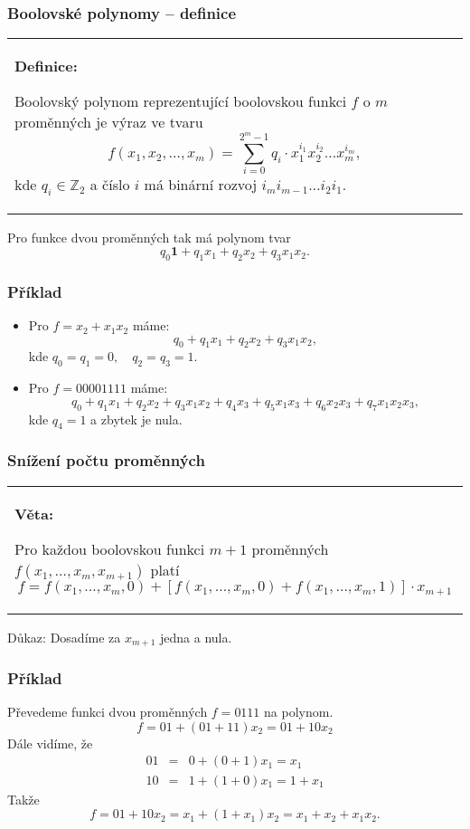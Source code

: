 \documentclass{beamer}
\newenvironment{definice}
{
    \begin{center}
    \begin{tabular}{p{9cm}}
    \textbf{Definice:}
}
{
    \end{tabular}
    \end{center}
}
\newenvironment{veta}
{
    \begin{center}
    \begin{tabular}{p{9cm}}
    \textbf{Věta:}
}
{
    \end{tabular}
    \end{center}
}
\newcommand{\cela}{\mathbb{Z}}
\newcommand{\one}{\textbf{1}}
\newenvironment{itemizex}%
  {\large \begin{itemize}%
    \setlength{\itemsep}{8pt}%
    \setlength{\parskip}{8pt}}%
  {\end{itemize}}
\begin{document}
\begin{frame}[t,fragile]\frametitle{Boolovské polynomy -- definice} 
  \begin{definice}
  Boolovský polynom reprezentující boolovskou funkci $f$ o $m$ proměnných je výraz ve tvaru
  $$
  f(x_1, x_2, \dots, x_m) = \sum_{i=0}^{2^{m}-1}q_i\cdot x_1^{i_1}x_2^{i_2}\dots x_m^{i_m},
  $$
  kde $q_i\in\cela_2$ a číslo $i$ má binární rozvoj $i_mi_{m-1}\dots i_2i_1$.
  \end{definice}

  Pro funkce dvou proměnných tak má polynom tvar
  $$
  q_0\one+q_1x_1+q_2x_2+q_3x_1x_2.
  $$
\end{frame}


\begin{frame}[t,fragile]\frametitle{Příklad} 
    \begin{itemizex}
        \item Pro $f=x_2+x_1x_2$ máme:
$$
q_0+q_1x_1+q_2x_2+q_3x_1x_2,
$$
        kde $q_0=q_1=0,\quad q_2= q_3=1$.
        \item Pro $f=00001111$ máme:
$$
q_0+q_1x_1+q_2x_2+q_3x_1x_2+q_4x_3+q_5x_1x_3+q_6x_2x_3+q_7x_1x_2x_3,
$$
        kde $q_4=1$ a zbytek je nula. 
    \end{itemizex}
\end{frame}


\begin{frame}[t,fragile]\frametitle{Snížení počtu proměnných} 
    \begin{veta}
    Pro každou boolovskou funkci $m+1$ proměnných $f(x_1,\dots,x_m, x_{m+1})$ platí
    $$
f = f(x_1,\dots,x_m,0)+[f(x_1,\dots,x_m,0)+f(x_1, \dots, x_m,1)]\cdot x_{m+1}
    $$
    \end{veta}

    Důkaz: Dosadíme za $x_{m+1}$ jedna a nula. 
\end{frame}


\begin{frame}[t,fragile]\frametitle{Příklad} 
Převedeme funkci dvou proměnných $f=0111$ na polynom.
$$
f=01+(01+11)x_2=01+10x_2
$$
Dále vidíme, že 
\begin{eqnarray*}
01&=& 0+(0+1)x_1=x_1\\
10&=& 1+(1+0)x_1=1+x_1
\end{eqnarray*}
Takže 
$$
f=01+10x_2=x_1+(1+x_1)x_2=x_1+x_2+x_1x_2.
$$
\end{frame}
\end{document}
